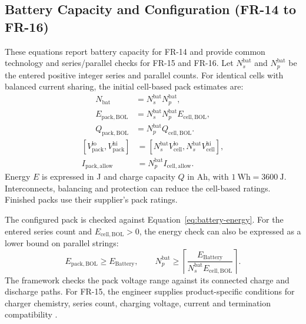 \subsection{Battery Capacity and Configuration (FR-14 to FR-16)}
These equations report battery capacity for FR-14 and provide common technology and series/parallel checks for FR-15 and FR-16. Let $N_s^{\mathrm{bat}}$ and $N_p^{\mathrm{bat}}$ be the entered positive integer series and parallel counts. For identical cells with balanced current sharing, the initial cell-based pack estimates are:
\begin{equation}
    \begin{aligned}
        N_{\mathrm{bat}}&=N_s^{\mathrm{bat}}N_p^{\mathrm{bat}},\\
        E_{\mathrm{pack,BOL}}&=N_s^{\mathrm{bat}}N_p^{\mathrm{bat}}E_{\mathrm{cell,BOL}},\\
        Q_{\mathrm{pack,BOL}}&=N_p^{\mathrm{bat}}Q_{\mathrm{cell,BOL}}.
    \end{aligned}
    \label{eq:battery-assembly-capacity}
\end{equation}
\begin{equation}
    \begin{aligned}
        \left[V_{\mathrm{pack}}^{\mathrm{lo}},V_{\mathrm{pack}}^{\mathrm{hi}}\right]
        &=\left[N_s^{\mathrm{bat}}V_{\mathrm{cell}}^{\mathrm{lo}},
           N_s^{\mathrm{bat}}V_{\mathrm{cell}}^{\mathrm{hi}}\right],\\
        I_{\mathrm{pack,allow}}&=N_p^{\mathrm{bat}}I_{\mathrm{cell,allow}}.
    \end{aligned}
    \label{eq:battery-assembly-ratings}
\end{equation}
Energy $E$ is expressed in J and charge capacity $Q$ in Ah, with $1~\mathrm{Wh}=3600~\mathrm{J}$. Interconnects, balancing and protection can reduce the cell-based ratings. Finished packs use their supplier's pack ratings.

The configured pack is checked against Equation~\eqref{eq:battery-energy}. For the entered series count and $E_{\mathrm{cell,BOL}}>0$, the energy check can also be expressed as a lower bound on parallel strings:
\begin{equation}
    E_{\mathrm{pack,BOL}}\geq E_{\mathrm{Battery}},
    \qquad
    N_p^{\mathrm{bat}}\geq
    \left\lceil\frac{E_{\mathrm{Battery}}}{N_s^{\mathrm{bat}}E_{\mathrm{cell,BOL}}}\right\rceil.
    \label{eq:battery-configuration-check}
\end{equation}
The framework checks the pack voltage range against its connected charge and discharge paths. For FR-15, the engineer supplies product-specific conditions for charger chemistry, series count, charging voltage, current and termination compatibility \citep[Secs.~2.2--2.3]{review-0573}.

